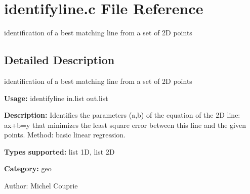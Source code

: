 \section{identifyline.c File Reference}
\label{identifyline_8c}
identification of a best matching line from a set of 2D points  




\label{_details}
\subsection{Detailed Description}
identification of a best matching line from a set of 2D points 

{\bf Usage:} identifyline in.list out.list

{\bf Description:} Identifies the parameters (a,b) of the equation of the 2D line: ax+b=y that minimizes the least square error between this line and the given points. Method: basic linear regression.

{\bf Types supported:} list 1D, list 2D

{\bf Category:} geo

\begin{Desc}
\item[Author:]Michel Couprie \end{Desc}
